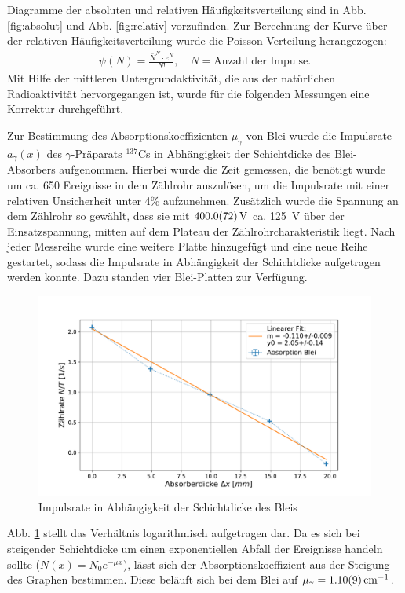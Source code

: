 	Diagramme der absoluten und relativen Häufigkeitsverteilung sind in Abb. \ref{fig:absolut} und Abb. \ref{fig:relativ} vorzufinden. 
	Zur Berechnung der Kurve über der relativen Häufigkeitsverteilung wurde die Poisson-Verteilung herangezogen: 
	\begin{align}
		\psi (N) = \frac{\bar{N}^N\cdot e^{\bar{N}}}{N!}, \quad N = \text{Anzahl der Impulse}.
	\end{align} 
	Mit Hilfe der mittleren Untergrundaktivität, die aus der natürlichen Radioaktivität hervorgegangen ist, wurde für die folgenden Messungen eine Korrektur durchgeführt.
	
	Zur Bestimmung des Absorptionskoeffizienten $\mu_\gamma$ von Blei wurde die Impulsrate $a_\gamma (x)$ des $\gamma$-Präparats $^{137}$Cs in Abhängigkeit der Schichtdicke des Blei-Absorbers aufgenommen.	
	Hierbei wurde die Zeit gemessen, die benötigt wurde um ca. 650 Ereignisse in dem Zählrohr auszulösen, um die Impulsrate mit einer relativen Unsicherheit unter 4\% aufzunehmen.
	Zusätzlich wurde die Spannung an dem Zählrohr so gewählt, dass sie mit $\SI{400+-7,2}{\volt}$ ca. \SI{125}{\volt} über der Einsatzspannung, mitten auf dem Plateau der Zählrohrcharakteristik liegt.
	Nach jeder Messreihe wurde eine weitere Platte hinzugefügt und eine neue Reihe gestartet, sodass die Impulsrate in Abhängigkeit der Schichtdicke aufgetragen werden konnte.
	Dazu standen vier Blei-Platten zur Verfügung.
	\begin{figure}[ht]
		\centering
		\includegraphics[width=\textwidth]{data/GammaAbsorber.pdf}
		\caption{Impulsrate in Abhängigkeit der Schichtdicke des Bleis}
		\label{fig:gamma}	
	\end{figure}
	Abb. \ref{fig:gamma} stellt das Verhältnis logarithmisch aufgetragen dar. 
	Da es sich bei steigender Schichtdicke um einen exponentiellen Abfall der Ereignisse handeln sollte ($N(x) = N_0 e^{-\mu x}$), lässt sich der Absorptionskoeffizient aus der Steigung des Graphen bestimmen.
	Diese beläuft sich bei dem Blei auf $\mu_\gamma = \SI{1.10+-0.09}{\per\centi\meter}$.
	
